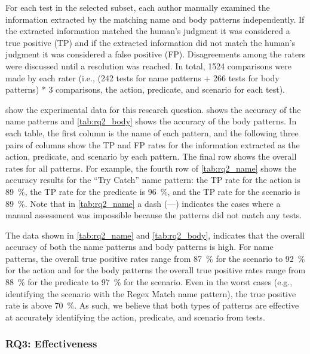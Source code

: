 \documentclass[proposal.tex]{subfiles}
\begin{document}
For each test in the selected subset, each author manually examined the information extracted by the matching name and body patterns independently.
%
If the extracted information matched the human's judgment it was considered a true positive (TP) and if the extracted information did not match the human's judgment it was considered a false positive (FP).
%
Disagreements among the raters were discussed until a resolution was reached.
%
In total, \num{1524} comparisons were made by each rater (i.e., (\num{242} tests for name patterns + \num{266} tests for body patterns) * \num{3} comparisons, the action, predicate, and scenario for each test).


 show the experimental data for this research question.
%
 shows the accuracy of the name patterns and \cref{tab:rq2_body} shows the accuracy of the body patterns.
%
In each table, the first column is the name of each pattern, and the following three pairs of columns show the TP and FP rates for the information extracted as the action, predicate, and scenario by each pattern.
%
The final row shows the overall rates for all patterns.
%
For example, the fourth row of \cref{tab:rq2_name} shows the accuracy results for the \enquote{Try Catch} name pattern: the TP rate for the action is \SI{89}{\percent}, the TP rate for the predicate is \SI{96}{\percent}, and the TP rate for the scenario is \SI{89}{\percent}.
%
Note that in \cref{tab:rq2_name} a dash (---) indicates the cases where a manual assessment was impossible because the patterns did not match any tests.


The data shown in \cref{tab:rq2_name} and \cref{tab:rq2_body}, indicates that the overall accuracy of both the name patterns and body patterns is high.
%
For name patterns, the overall true positive rates range from \SI{87}{\percent} for the scenario to \SI{92}{\percent} for the action and for the body patterns the overall true positive rates range from \SI{88}{\percent} for the predicate to \SI{97}{\percent} for the scenario.
%
Even in the worst cases (e.g., identifying the scenario with the Regex Match name pattern), the true positive rate is above \SI{70}{\percent}.
%
As such, we believe that both types of patterns are effective at accurately identifying the action, predicate, and scenario from tests.


\subsubsection{RQ3: Effectiveness}
\end{document}
